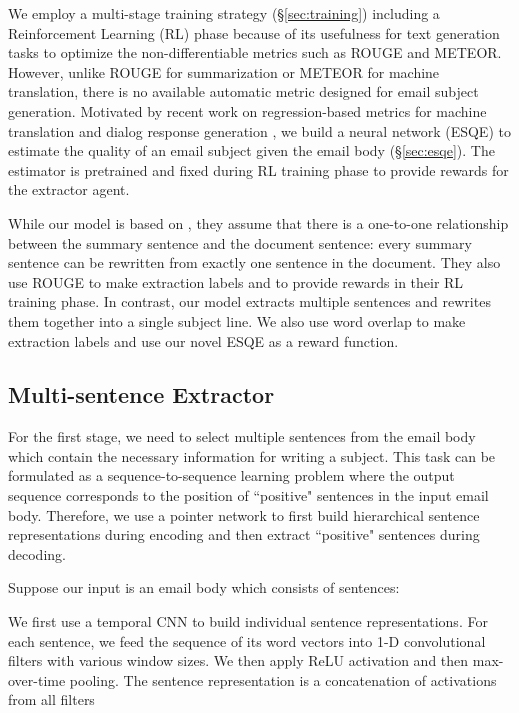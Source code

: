 \documentclass[11pt,a4paper]{article}
\newcommand{\esqe}{{\sc ESQE}\xspace}
\begin{document}
We employ a multi-stage training strategy (\S\ref{sec:training}) including a Reinforcement Learning (RL) phase because of its usefulness for text generation tasks \cite{ranzato2016sequence,bahdanau2017actor} to optimize the non-differentiable metrics such as ROUGE and METEOR.
However, unlike ROUGE for summarization or METEOR for machine translation, there is no available automatic metric designed for email subject generation.
Motivated by recent work on regression-based metrics for machine translation \cite{shimanaka2018metric} and dialog response generation \cite{lowe2017towards}, we build a neural network (ESQE) to estimate the quality of an email subject given the email body (\S\ref{sec:esqe}).
The estimator is pretrained and fixed during RL training phase to provide rewards for the extractor agent.

While our model is based on , they assume that there is a one-to-one relationship between the summary sentence and the document sentence: every summary sentence can be rewritten from exactly one sentence in the document.
They also use ROUGE to make extraction labels and to provide rewards in their RL training phase.
In contrast, our model extracts multiple sentences and rewrites them together into a single subject line.
We also use word overlap to make extraction labels and use our novel \esqe as a reward function.

\subsection{Multi-sentence Extractor}
\label{sec:extractor}
For the first stage, we need to select multiple sentences from the email body which contain the necessary information for writing a subject.
This task can be formulated as a sequence-to-sequence learning problem where the output sequence corresponds to the position of ``positive" sentences in the input email body.
Therefore, we use a pointer network \cite{vinyals2015pointer} to first build hierarchical sentence representations during encoding and then extract ``positive" sentences during decoding.

Suppose our input is an email body  which consists of  sentences:

We first use a temporal CNN \cite{kim2014conv} to build individual sentence representations.
For each sentence, we feed the sequence of its word vectors into 1-D convolutional filters with various window sizes.
We then apply ReLU activation and then max-over-time pooling.
The sentence representation is a concatenation of activations from all filters
\end{document}
